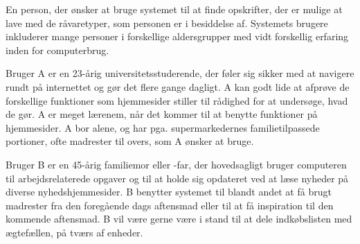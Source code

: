 {En person, der ønsker at bruge systemet \Foodl{} til at finde opskrifter, der er mulige at lave med de råvaretyper, som personen er i besiddelse af.}
{Systemets brugere inkluderer mange personer i forskellige aldersgrupper med vidt forskellig erfaring inden for computerbrug.}
{Bruger A er en 23-årig universitetsstuderende, der føler sig sikker med at navigere rundt på internettet og gør det flere gange dagligt. A kan godt lide at afprøve de forskellige funktioner som hjemmesider stiller til rådighed for at undersøge, hvad de gør. A er meget lærenem, når det kommer til at benytte funktioner på hjemmesider. A bor alene, og har pga. supermarkedernes familietilpassede portioner, ofte madrester til overs, som A ønsker at bruge. 

Bruger B er en 45-årig familiemor eller -far, der hovedsagligt bruger computeren til arbejdsrelaterede opgaver og til at holde sig opdateret ved at læse nyheder på diverse nyhedshjemmesider.  B benytter systemet til blandt andet at få brugt madrester fra den foregående dags aftensmad eller til at få inspiration til den kommende aftensmad. B vil være gerne være i stand til at dele indkøbslisten med ægtefællen, på tværs af enheder.}
{}
